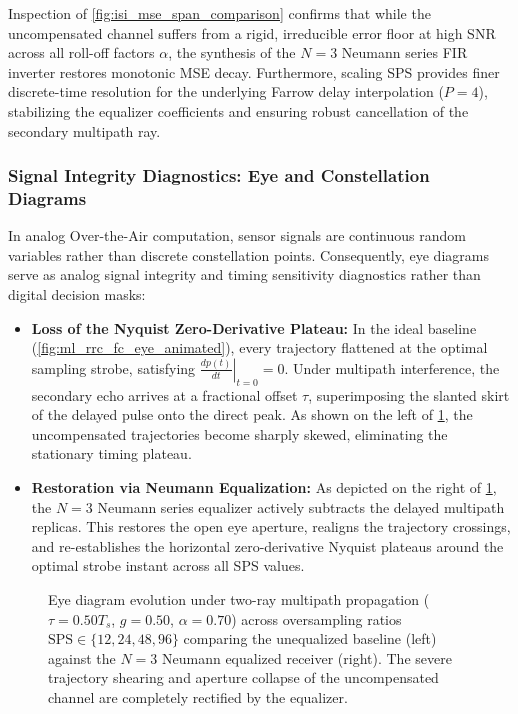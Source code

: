 \documentclass[Markos_Delaportas_1316.tex]{subfiles}
\begin{document}
Inspection of \cref{fig:isi_mse_span_comparison} confirms that while
the uncompensated channel suffers from a rigid, irreducible error floor
at high SNR across all roll-off factors $\alpha$, the synthesis of the
$N=3$ Neumann series FIR inverter restores monotonic MSE decay.
Furthermore, scaling SPS provides finer discrete-time resolution for the
underlying Farrow delay interpolation ($P = 4$), stabilizing the
equalizer coefficients and ensuring robust cancellation of the secondary
multipath ray.

\subsubsection{Signal Integrity Diagnostics: Eye and Constellation Diagrams}
\label{subsubsec:eye_and_constellation_diagnostics}
In analog Over-the-Air computation, sensor signals are continuous
random variables rather than discrete constellation points.
Consequently, eye diagrams serve as analog signal integrity and
timing sensitivity diagnostics rather than digital decision masks:
\begin{itemize}[leftmargin=*]
    \item \textbf{Loss of the Nyquist Zero-Derivative Plateau:} In
        the ideal baseline (\cref{fig:ml_rrc_fc_eye_animated}),
        every trajectory flattened at the optimal sampling strobe, satisfying
        $\left.\frac{dp(t)}{dt}\right|_{t=0} = 0$. Under multipath
        interference, the secondary echo arrives at a fractional offset $\tau$,
        superimposing the slanted skirt of the delayed pulse onto the
        direct peak. As shown on the left of \cref{fig:ml_multipath_eye},
        the uncompensated trajectories become sharply skewed, eliminating
        the stationary timing plateau.
    \item \textbf{Restoration via Neumann Equalization:} As depicted
        on the right of \cref{fig:ml_multipath_eye}, the $N=3$ Neumann
        series equalizer actively subtracts the delayed multipath replicas.
        This restores the open eye aperture, realigns the trajectory crossings,
        and re-establishes the horizontal zero-derivative Nyquist plateaus
        around the optimal strobe instant across all SPS values.
\end{itemize}

\begin{figure}[htbp]
    \centering
    \caption{Eye diagram evolution under two-ray multipath
        propagation ($\tau = 0.50 T_s$, $g = 0.50$, $\alpha = 0.70$)
        across oversampling ratios $\text{SPS} \in \{12, 24, 48, 96\}$
        comparing the unequalized baseline (left) against the $N=3$
        Neumann equalized receiver (right). The severe trajectory shearing
        and aperture collapse of the uncompensated channel are completely
    rectified by the equalizer.}
    \label{fig:ml_multipath_eye}
\end{figure}
\end{document}
